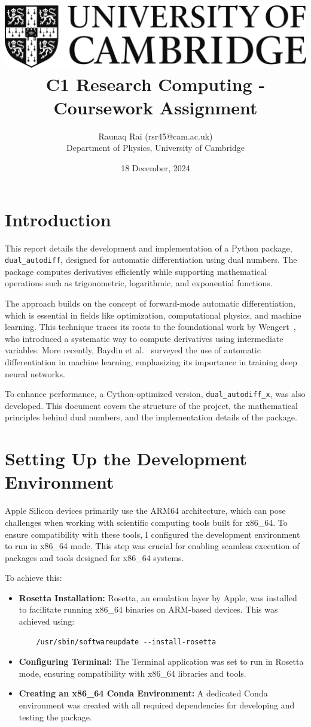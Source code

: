 \documentclass[a4paper,12pt]{article}
\title{
    \includegraphics[scale=0.4]{Cam_logo_bw.png}\\
    \vspace{0.5cm}
    C1 Research Computing - Coursework Assignment
}
\author{Raunaq Rai (rsr45@cam.ac.uk)\\
    Department of Physics, University of Cambridge
}
\date{18 December, 2024}
\begin{document}
\maketitle

\section{Introduction}
This report details the development and implementation of a Python package, \texttt{dual\_autodiff}, designed for automatic differentiation using dual numbers. The package computes derivatives efficiently while supporting mathematical operations such as trigonometric, logarithmic, and exponential functions.

The approach builds on the concept of forward-mode automatic differentiation, which is essential in fields like optimization, computational physics, and machine learning. This technique traces its roots to the foundational work by Wengert~\cite{wengert1964automatic}, who introduced a systematic way to compute derivatives using intermediate variables. More recently, Baydin et al.~\cite{baydin2018automatic} surveyed the use of automatic differentiation in machine learning, emphasizing its importance in training deep neural networks.

To enhance performance, a Cython-optimized version, \texttt{dual\_autodiff\_x}, was also developed. This document covers the structure of the project, the mathematical principles behind dual numbers, and the implementation details of the package.

\section{Setting Up the Development Environment}

Apple Silicon devices primarily use the ARM64 architecture, which can pose challenges when working with scientific computing tools built for x86\_64. To ensure compatibility with these tools, I configured the development environment to run in x86\_64 mode. This step was crucial for enabling seamless execution of packages and tools designed for x86\_64 systems.

To achieve this:
\begin{itemize}
    \item \textbf{Rosetta Installation:} Rosetta, an emulation layer by Apple, was installed to facilitate running x86\_64 binaries on ARM-based devices. This was achieved using:
    \begin{verbatim}
    /usr/sbin/softwareupdate --install-rosetta
    \end{verbatim}
    \item \textbf{Configuring Terminal:} The Terminal application was set to run in Rosetta mode, ensuring compatibility with x86\_64 libraries and tools.
    \item \textbf{Creating an x86\_64 Conda Environment:} A dedicated Conda environment was created with all required dependencies for developing and testing the package.
\end{itemize}
\end{document}
